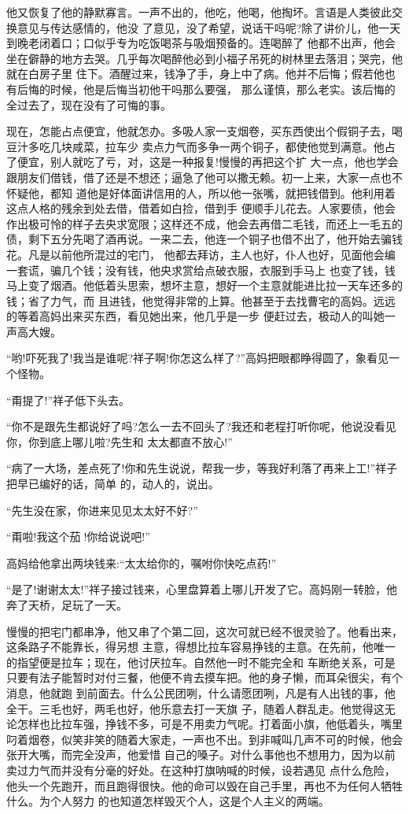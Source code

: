 \documentclass[11pt,a4paper,onecolumn]{article}
\begin{document}
他又恢复了他的静默寡言。一声不出的，他吃，他喝，他掏坏。言语是人类彼此交换意见与传达感情的，他没
了意见，没了希望，说话干吗呢?除了讲价儿，他一天到晚老闭着口；口似乎专为吃饭喝茶与吸烟预备的。连喝醉了
他都不出声，他会坐在僻静的地方去哭。几乎每次喝醉他必到小福子吊死的树林里去落泪；哭完，他就在白房子里
住下。酒醒过来，钱净了手，身上中了病。他并不后悔；假若他也有后悔的时候，他是后悔当初他干吗那么要强，
那么谨慎，那么老实。该后悔的全过去了，现在没有了可悔的事。

现在，怎能占点便宜，他就怎办。多吸人家一支烟卷，买东西使出个假铜子去，喝豆汁多吃几块咸菜，拉车少
卖点力气而多争一两个铜子，都使他觉到满意。他占了便宜，别人就吃了亏，对，这是一种报复!慢慢的再把这个扩
大一点，他也学会跟朋友们借钱，借了还是不想还；逼急了他可以撒无赖。初一上来，大家一点也不怀疑他，都知
道他是好体面讲信用的人，所以他一张嘴，就把钱借到。他利用着这点人格的残余到处去借，借着如白捡，借到手
便顺手儿花去。人家要债，他会作出极可怜的样子去央求宽限；这样还不成，他会去再借二毛钱，而还上一毛五的
债，剩下五分先喝了酒再说。一来二去，他连一个铜子也借不出了，他开始去骗钱花。凡是以前他所混过的宅门，
他都去拜访，主人也好，仆人也好，见面他会编一套谎，骗几个钱；没有钱，他央求赏给点破衣服，衣服到手马上
也变了钱，钱马上变了烟酒。他低着头思索，想坏主意，想好一个主意就能进比拉一天车还多的钱；省了力气，而
且进钱，他觉得非常的上算。他甚至于去找曹宅的高妈。远远的等着高妈出来买东西，看见她出来，他几乎是一步
便赶过去，极动人的叫她一声高大嫂。

``哟!吓死我了!我当是谁呢?祥子啊!你怎这么样了?''高妈把眼都睁得圆了，象看见一个怪物。

``甭提了!''祥子低下头去。

``你不是跟先生都说好了吗?怎么一去不回头了?我还和老程打听你呢，他说没看见你，你到底上哪儿啦?先生和
太太都直不放心!''

``病了一大场，差点死了!你和先生说说，帮我一步，等我好利落了再来上工!''祥子把早已编好的话，简单
的，动人的，说出。

``先生没在家，你进来见见太太好不好?''

``甭啦!我这个茄!你给说说吧!''

高妈给他拿出两块钱来:``太太给你的，嘱咐你快吃点药!''

``是了!谢谢太太!''祥子接过钱来，心里盘算着上哪儿开发了它。高妈刚一转脸，他奔了天桥，足玩了一天。

慢慢的把宅门都串净，他又串了个第二回，这次可就已经不很灵验了。他看出来，这条路子不能靠长，得另想
主意，得想比拉车容易挣钱的主意。在先前，他唯一的指望便是拉车；现在，他讨厌拉车。自然他一时不能完全和
车断绝关系，可是只要有法子能暂时对付三餐，他便不肯去摸车把。他的身子懒，而耳朵很尖，有个消息，他就跑
到前面去。什么公民团咧，什么请愿团咧，凡是有人出钱的事，他全干。三毛也好，两毛也好，他乐意去打一天旗
子，随着人群乱走。他觉得这无论怎样也比拉车强，挣钱不多，可是不用卖力气呢。打着面小旗，他低着头，嘴里
叼着烟卷，似笑非笑的随着大家走，一声也不出。到非喊叫几声不可的时候，他会张开大嘴，而完全没声，他爱惜
自己的嗓子。对什么事他也不想用力，因为以前卖过力气而并没有分毫的好处。在这种打旗呐喊的时候，设若遇见
点什么危险，他头一个先跑开，而且跑得很快。他的命可以毁在自己手里，再也不为任何人牺牲什么。为个人努力
的也知道怎样毁灭个人，这是个人主义的两端。
\end{document}
